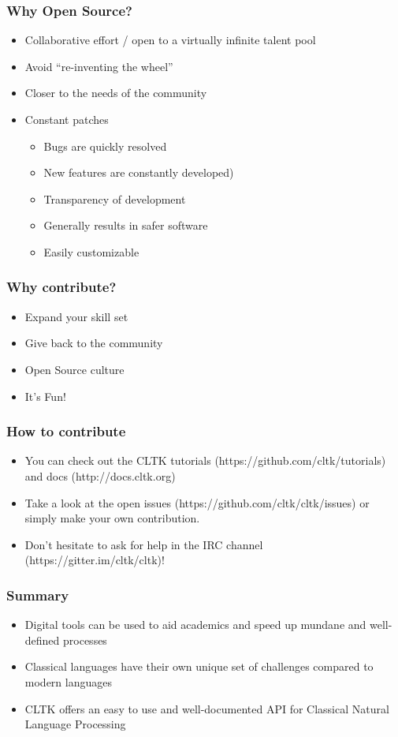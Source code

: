\documentclass{beamer}
\begin{document}
\begin{frame}
\frametitle{Why Open Source?}
\begin{itemize}
    \item Collaborative effort / open to a virtually infinite talent pool
    \item Avoid “re-inventing the wheel”
    \item Closer to the needs of the community
    \item Constant patches 
    \begin{itemize}
    \item Bugs are quickly resolved 
    \item New features are constantly developed)
    \item Transparency of development
    \item Generally results in safer software
    \item Easily customizable
    \end{itemize}
\end{itemize}
\end{frame}




\begin{frame}
\frametitle{Why contribute?}
\begin{itemize}
    \item Expand your skill set
    \item Give back to the community
    \item Open Source culture
    \item It’s Fun!
\end{itemize}
\end{frame}



\begin{frame}
\frametitle{How to contribute}
\begin{itemize}
    \item You can check out the CLTK tutorials (https://github.com/cltk/tutorials) and docs (http://docs.cltk.org)
    \item Take a look at the open issues (https://github.com/cltk/cltk/issues) or simply make your own contribution.
    \item Don’t hesitate to ask for help in the IRC channel (https://gitter.im/cltk/cltk)!
\end{itemize}
\end{frame}




\begin{frame}
\frametitle{Summary}
\begin{itemize}
    \item Digital tools can be used to aid academics and speed up mundane and well-defined processes
    \item Classical languages have their own unique set of challenges compared to modern languages
    \item CLTK offers an easy to use and well-documented API for Classical Natural Language Processing
\end{itemize}
\end{frame}
\end{document}
